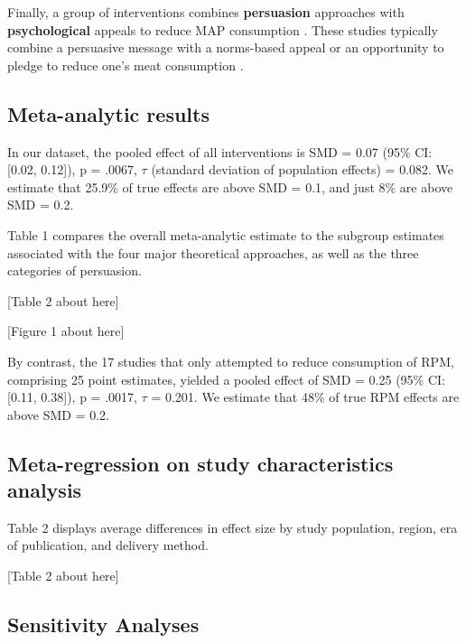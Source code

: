 \documentclass[sn-nature,referee,pdflatex]{sn-jnl}
\begin{document}
Finally, a group of interventions combines \textbf{persuasion}
approaches with \textbf{psychological} appeals to reduce MAP consumption
\citep{aberman2018, berndsen2005, bertolaso2015, carfora2023, fehrenbach2015, hennessy2016, mathur2021effectiveness, mattson2020, piester2020, shreedhar2021}.
These studies typically combine a persuasive message with a norms-based
appeal \citep{piester2020, mattson2020} or an opportunity to pledge to
reduce one's meat consumption
\citep{mathur2021effectiveness, shreedhar2021}.

\subsection{Meta-analytic results}\label{sec2.3}

In our dataset, the pooled effect of all interventions is SMD = 0.07
(95\% CI: {[}0.02, 0.12{]}), p = .0067, \(\tau\) (standard deviation of
population effects) = 0.082. We estimate that 25.9\% of true effects are
above SMD = 0.1, and just 8\% are above SMD = 0.2.

Table 1 compares the overall meta-analytic estimate to the subgroup
estimates associated with the four major theoretical approaches, as well
as the three categories of persuasion.

\begin{center}
[Table 2 about here]
\end{center}
\begin{center}
[Figure 1 about here]
\end{center}

By contrast, the 17 studies that only attempted to reduce consumption of
RPM, comprising 25 point estimates, yielded a pooled effect of SMD =
0.25 (95\% CI: {[}0.11, 0.38{]}), p = .0017, \(\tau\) = 0.201. We
estimate that 48\% of true RPM effects are above SMD = 0.2.

\subsection{Meta-regression on study characteristics
analysis}\label{sec2.4}

Table 2 displays average differences in effect size by study population,
region, era of publication, and delivery method.

\begin{center}
[Table 2 about here]
\end{center}

\subsection{Sensitivity Analyses}\label{sec2.5}
\end{document}
